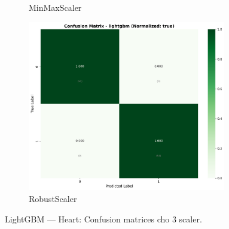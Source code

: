 \begin{figure}[H]
\begin{subfigure}[b]{0.31\textwidth}
\caption{MinMaxScaler}\label{fig:lgbm_heart_cm_minmax}
\end{subfigure}\hfill
\begin{subfigure}[b]{0.31\textwidth}\centering
\includegraphics[width=0.95\textwidth]{Result/heart_dataset/confusion_matrices/lightgbm_numeric_dataset_RobustScaler.png}
\caption{RobustScaler}\label{fig:lgbm_heart_cm_robust}
\end{subfigure}
\caption{LightGBM — Heart: Confusion matrices cho 3 scaler.}
\label{fig:lgbm_heart_confusions}
\end{figure}


